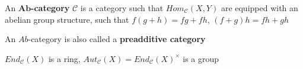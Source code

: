 \documentclass[../main.tex]{subfiles}
\begin{document}
\begin{definition}
An $\mathbf{Ab}$\textbf{-category} $\mathscr C$ is a category such that $Hom_{\mathscr C}(X,Y)$ are equipped with an abelian group structure, such that $f(g+h)=fg+fh$, $(f+g)h=fh+gh$
\end{definition}

\begin{remark}
An $Ab$-category is also called a \textbf{preadditive category} \par
$End_{\mathscr C}(X)$ is a ring, $Aut_{\mathscr C}(X)=End_{\mathscr C}(X)^\times$ is a group
\end{remark}
\end{document}
